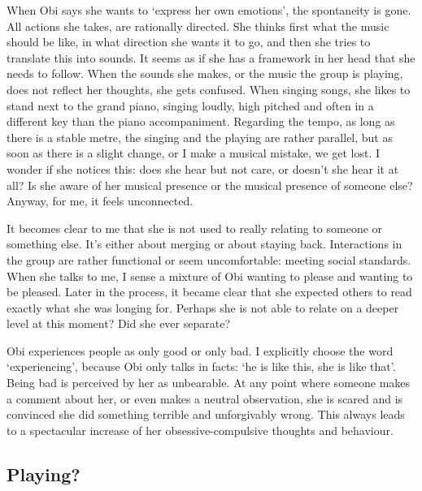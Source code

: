 \documentclass[authordate, empirical]{jote-new-article}
\begin{document}
When Obi says she wants to ‘express her own emotions', the spontaneity is gone. All actions she takes, are rationally directed. She thinks first what the music should be like, in what direction she wants it to go, and then she tries to translate this into sounds. It seems as if she has a framework in her head that she needs to follow. When the sounds she makes, or the music the group is playing, does not reflect her thoughts, she gets confused. When singing songs, she likes to stand next to the grand piano, singing loudly, high pitched and often in a different key than the piano accompaniment. Regarding the tempo, as long as there is a stable metre, the singing and the playing are rather parallel, but as soon as there is a slight change, or I make a musical mistake, we get lost. I wonder if she notices this: does she hear but not care, or doesn't she hear it at all? Is she aware of her musical presence or the musical presence of someone else? Anyway, for me, it feels unconnected.



It becomes clear to me that she is not used to really relating to someone or something else. It's either about merging or about staying back. Interactions in the group are rather functional or seem uncomfortable: meeting social standards. When she talks to me, I sense a mixture of Obi wanting to please and wanting to be pleased. Later in the process, it became clear that she expected others to read exactly what she was longing for. Perhaps she is not able to relate on a deeper level at this moment? Did she ever separate?



Obi experiences people as only good or only bad. I explicitly choose the word ‘experiencing', because Obi only talks in facts: ‘he is like this, she is like that'. Being bad is perceived by her as unbearable. At any point where someone makes a comment about her, or even makes a neutral observation, she is scared and is convinced she did something terrible and unforgivably wrong. This always leads to a spectacular increase of her obsessive-compulsive thoughts and behaviour.







\subsection{Playing?}
\end{document}
